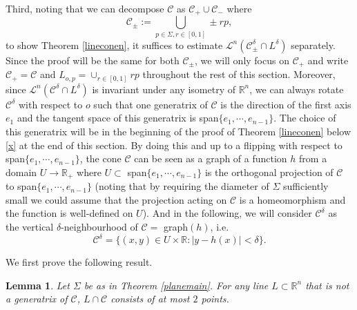 \documentclass[11pt,a4paper,reqno]{amsart}
\newcommand{\R}{\mathbb{R}}
\newcommand{\calL}{\mathcal{L}}
\newcommand{\calC}{\mathcal{C}}
\newcommand{\1}{\mathbf{1}}
\numberwithin{equation}{section}
\theoremstyle{plain}
\newtheorem{lemma}[equation]{Lemma}
\theoremstyle{definition}
\theoremstyle{remark}
\begin{document}
Third, noting that we can decompose $\calC$ as $\calC_+ \cup \calC_-$ where
$$ \calC_\pm:=  \bigcup_{p \in \Sigma, r \in [0,1]}  \pm rp, $$
to show Theorem \ref{lineconen}, it suffices to estimate $\calL^{n}(\calC^\delta_\pm \cap L^\delta)$ separately. Since the proof will be the same for both $\calC_\pm$, we will only focus on $\calC_+$ and write $\calC_+=\calC$ and $L_{o,p}=\cup_{r \in [0,1]}rp$ throughout the rest of this section.
Moreover,
since $\calL^{n}(\calC^\delta \cap L^\delta)$ is invariant under any isometry of $\R^n$, we can always rotate $\calC^\delta$ with respect to $o$ such that one generatrix of $\calC$ is the direction of the first axis $e_1$ and the tangent space of this generatrix is span$\{e_1, \cdots, e_{n-1}\}$. The choice of this generatrix will be in the beginning of the proof of Theorem \ref{lineconen} below \eqref{x} at the end of this section.
By doing this and up to a flipping with respect to span$\{e_1, \cdots, e_{n-1}\}$, the cone $\calC$ can be seen as a graph of a function $h$ from a domain $U \to \R_+$ where $U \subset$ span$\{e_1, \cdots, e_{n-1}\}$ is the orthogonal projection of $\calC$ to span$\{e_1, \cdots, e_{n-1}\}$ (noting that by requiring the diameter of $\Sigma$ sufficiently small we could assume that the projection acting on $\calC$ is a homeomorphism and the function is well-defined on $U$). And in the following, we will consider $\calC^\delta$ as the vertical $\delta$-neighbourhood of $\calC=$ graph$(h)$, i.e.
$$ \calC^\delta = \{ (x,y)\in U \times \R: |y-h(x)|< \delta \}. $$







We first prove the following result.

\begin{lemma} \label{twopt}
Let $\Sigma$ be as in Theorem \ref{planemain}. For  any line $L \subset \R^n$ that is not a generatrix of $\calC$,
$L \cap \calC$ consists of at most $2$ points.
\end{lemma}
\end{document}
